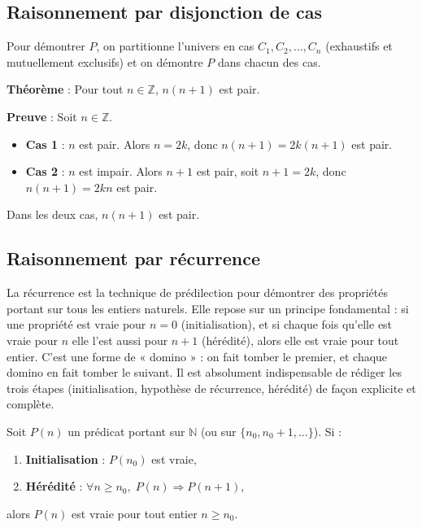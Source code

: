 \documentclass[11pt,a4paper,twoside]{book}
\newcommand{\N}{\mathbb{N}}
\newcommand{\Z}{\mathbb{Z}}
\begin{document}
\subsection{Raisonnement par disjonction de cas}

\begin{methodebox}
Pour démontrer $P$, on partitionne l'univers en cas $C_1, C_2, \ldots, C_n$
(exhaustifs et mutuellement exclusifs) et on démontre $P$ dans chacun des cas.
\end{methodebox}

\begin{exemplebox}
\textbf{Théorème} : Pour tout $n \in \Z$, $n(n+1)$ est pair.

\textbf{Preuve} : Soit $n \in \Z$.
\begin{itemize}
  \item \textbf{Cas 1} : $n$ est pair. Alors $n = 2k$, donc $n(n+1) = 2k(n+1)$ est pair.
  \item \textbf{Cas 2} : $n$ est impair. Alors $n+1$ est pair, soit $n+1 = 2k$,
        donc $n(n+1) = 2kn$ est pair.
\end{itemize}
Dans les deux cas, $n(n+1)$ est pair.
\end{exemplebox}

\subsection{Raisonnement par récurrence}

La récurrence est la technique de prédilection pour démontrer des propriétés portant sur tous les entiers naturels. Elle repose sur un principe fondamental : si une propriété est vraie pour $n=0$ (initialisation), et si chaque fois qu'elle est vraie pour $n$ elle l'est aussi pour $n+1$ (hérédité), alors elle est vraie pour tout entier. C'est une forme de « domino » : on fait tomber le premier, et chaque domino en fait tomber le suivant. Il est absolument indispensable de rédiger les trois étapes (initialisation, hypothèse de récurrence, hérédité) de façon explicite et complète.

\begin{theoremebox}
Soit $P(n)$ un prédicat portant sur $\N$ (ou sur $\{n_0, n_0+1, \ldots\}$).
Si :
\begin{enumerate}[label=(\roman*)]
  \item \textbf{Initialisation} : $P(n_0)$ est vraie,
  \item \textbf{Hérédité} : $\forall n \geq n_0,\; P(n) \Rightarrow P(n+1)$,
\end{enumerate}
alors $P(n)$ est vraie pour tout entier $n \geq n_0$.
\end{theoremebox}
\end{document}
